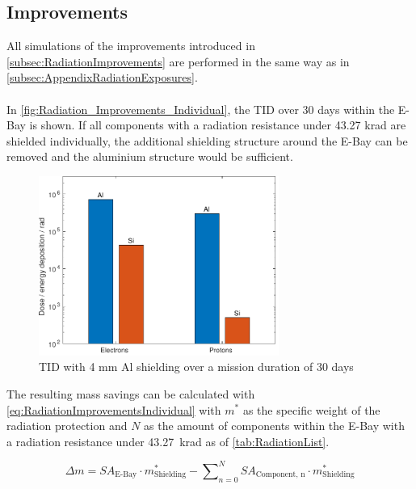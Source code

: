 \newpage

\subsection{Improvements}

\label{app:AppendixRadiationImprovements}

All simulations of the improvements introduced in \autoref{subsec:RadiationImprovements} are performed in the same way as in \autoref{subsec:AppendixRadiationExposures}. \\ \\
In \autoref{fig:Radiation_Improvements_Individual}, the TID over 30 days within the E-Bay is shown. If all components with a radiation resistance under 43.27 krad are shielded individually, the additional shielding structure around the E-Bay can be removed and the aluminium structure would be sufficient.

\begin{figure}[htp]
	\centering
	\includegraphics[width=0.7\textwidth]{Media/J_Improvements_Individual}
	\caption{TID with 4 mm Al shielding over a mission duration of 30 days}
	\label{fig:Radiation_Improvements_Individual}
\end{figure}

The resulting mass savings can be calculated with \autoref{eq:RadiationImprovementsIndividual} with \(m^*\) as the specific weight of the radiation protection and \(N\) as the amount of components within the E-Bay with a radiation resistance under 43.27~krad as of \autoref{tab:RadiationList}.

\begin{equation}
	\Delta m = SA_\text{E-Bay} \cdot m^*_\text{Shielding} - \sum\nolimits_{n=0}^N SA_\text{Component, n} \cdot m^*_\text{Shielding}
	\label{eq:RadiationImprovementsIndividual}
\end{equation}

